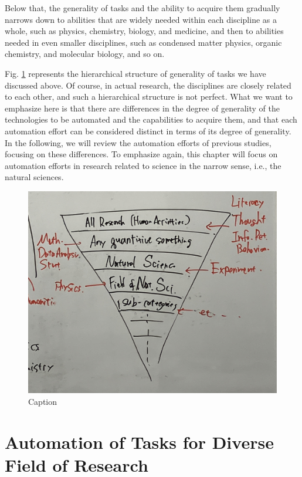 Below that, the generality of tasks and the ability to acquire them gradually narrows down to abilities that are widely needed within each discipline as a whole, such as physics, chemistry, biology, and medicine, and then to abilities needed in even smaller disciplines, such as condensed matter physics, organic chemistry, and molecular biology, and so on.

Fig. \ref{fig:generality_level} represents the hierarchical structure of generality of tasks we have discussed above. Of course, in actual research, the disciplines are closely related to each other, and such a hierarchical structure is not perfect. What we want to emphasize here is that there are differences in the degree of generality of the technologies to be automated and the capabilities to acquire them, and that each automation effort can be considered distinct in terms of its degree of generality. In the following, we will review the automation efforts of previous studies, focusing on these differences. To emphasize again, this chapter will focus on automation efforts in research related to science in the narrow sense, i.e., the natural sciences.


\begin{figure}[htb]
    \centering
    \includegraphics[width=\linewidth]{figs/generality_level.jpg}
    \caption{Caption}
    \label{fig:generality_level}
\end{figure}

\section{Automation of Tasks for Diverse Field of Research}

